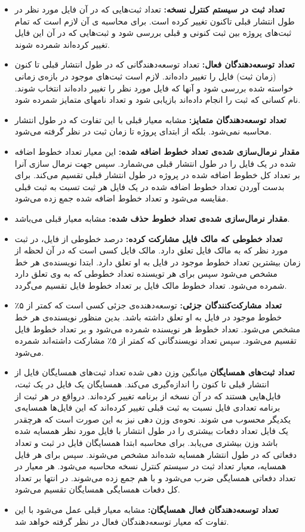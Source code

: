 \begin{itemize}
\item
\textbf{تعداد ثبت در سیستم کنترل نسخه:}
 تعداد ثبت‌هایی که در آن فایل مورد نظر در طول انتشار قبلی تاکنون تغییر کرده است. برای محاسبه ی آن لازم است که تمام ثبت‌های پروژه بین ثبت کنونی و  قبلی بررسی شود و ثبت‌هایی که در آن این فایل تغییر کرده‌اند شمرده شوند.
 \item
\textbf{تعداد توسعه‌دهندگان 
	فعال:}
 تعداد توسعه‌دهندگانی که در طول انتشار قبلی تا کنون (زمان ثبت) فایل را تغییر داده‌اند. لازم است ثبت‌های موجود در باز‌ه‌ی زمانی خواسته شده بررسی شود و آنها که فایل مورد نظر را تغییر داده‌اند انتخاب شوند. نام کسانی که ثبت را انجام داده‌اند بازیابی شود و تعداد نامهای متمایز شمرده شود. 
 \item
 \textbf{تعداد توسعه‌دهندگان	متمایز:}
 مشابه معیار قبلی با این تفاوت که در طول انتشار محاسبه نمی‌شود. بلکه از ابتدای پروژه تا زمان ثبت در نظر گرفته می‌شود. 
\item
\textbf{مقدار نرمال‌سازی شده‌ی تعداد خطوط اضافه شده:}
این معیار تعداد خطوط اضافه شده در یک فایل را در طول انتشار قبلی می‌شمارد. سپس جهت نرمال سازی آنرا بر تعداد کل خطوط اضافه شده در پروژه در طول انتشار قبلی تقسیم می‌کند. برای بدست آوردن تعداد خطوط اضافه شده در یک فایل هر ثبت تسبت به ثبت قبلی مقایسه می‌شود و تعداد خطوط اضافه شده جمع زده می‌شود.
\item
\textbf{مقدار نرمال‌سازی شده‌ی تعداد خطوط حذف شده:}
مشابه معیار قبلی می‌باشد. 
\item
\textbf{تعداد خطوطی که مالک فایل مشارکت کرده:}
 درصد خطوطی  از فایل، در  ثبت مورد نظر  که به مالک فایل تعلق دارد. مالک فایل کسی است که در آن لحظه از زمان بیشترین تعداد خطوط موجود در فایل به او تعلق دارد. ابتدا نویسنده‌ی هر خط مشخص می‌شود سپس برای هر تویسنده تعداد خطوطی که به وی تعلق دارد شمرده می‌شود. تعداد خطوط مالک فایل بر تعداد خطوط فایل تقسیم می‌گردد.
\item
\textbf{تعداد مشارکت‌کنندگان جزئی:}
توسعه‌دهنده‌ی جزئی کسی است که کمتر از ۵٪ خطوط موجود در فایل به او تعلق داشته باشد. بدین منظور نویسنده‌ی هر خط مشخص می‌شود. تعداد خطوط هر نویسنده شمرده می‌شود و بر تعداد خطوط فایل تقسیم می‌شود. سپس تعداد نویسندگانی که کمتر از ۵٪ مشارکت داشته‌اند شمرده می‌شود. 
\item
\textbf{تعداد ثبت‌های همسایگان}
 میانگین وزن دهی شده تعداد ثبت‌های همسایگان فایل از انتشار قبلی تا کنون را اندازه‌گیری می‌کند. همسایگان یک فایل در یک ثبت، فایل‌هایی هستند که در آن نسخه از برنامه تغییر کرده‌اند. در‌واقع در هر ثبت از برنامه تعدادی فایل نسبت به ثبت قبلی تغییر کرده‌اند که این فایل‌ها همسایه‌ی یکدیگر محسوب می شوند. نحوه‌ی وزن دهی نیز به این صورت است که هرچقدر یک فایل تعداد دفعات بیشتری را در طول انتشار با فایل مورد نظر همسایه شده باشد وزن بیشتری می‌یابد. برای محاسبه ابتدا همسایگان فایل در ثبت  و تعداد دفعاتی که  در طول انتشار همسایه شده‌اند مشخص می‌شوند. سپس برای هر فایل همسایه، معیار تعداد ثبت در سیستم کنترل نسخه محاسبه می‌شود. هر معیار در تعداد دفعاتی همسایگی ضرب می‌شود و با هم جمع زده می‌شوند. در انتها بر تعداد کل دفعات همسایگی همسایگان تقسیم می‌شود. 
\item
\textbf{تعداد توسعه‌دهندگان فعال همسایگان:}
مشابه معیار قبلی عمل می‌شود با این تفاوت که معیار توسعه‌دهندگان فعال در نظر گرفته خواهد شد.


\end{itemize}
